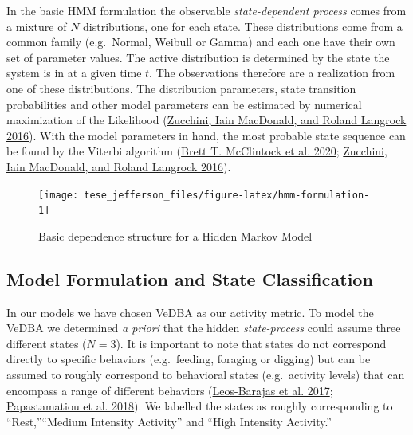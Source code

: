 \documentclass[english,msc,numbers,hidelinks]{coppe}
\begin{document}
  In the basic HMM formulation the observable \emph{state-dependent process} comes from a mixture of \(N\) distributions, one for each state. These distributions come from a common family (e.g.~Normal, Weibull or Gamma) and each one have their own set of parameter values. The active distribution is determined by the state the system is in at a given time \(t\). The observations therefore are a realization from one of these distributions. The distribution parameters, state transition probabilities and other model parameters can be estimated by numerical maximization of the Likelihood (\protect\hyperlink{ref-zucchini2016}{Zucchini, Iain MacDonald, and Roland Langrock 2016}). With the model parameters in hand, the most probable state sequence can be found by the Viterbi algorithm (\protect\hyperlink{ref-mcclintock2020}{Brett T. McClintock et al. 2020}; \protect\hyperlink{ref-zucchini2016}{Zucchini, Iain MacDonald, and Roland Langrock 2016}).
  \begin{figure}

  {\centering \texttt{[image: tese\_jefferson\_files/figure-latex/hmm-formulation-1]} 

  }

  \caption{Basic dependence structure for a Hidden Markov Model}\label{fig:hmm-formulation}
  \end{figure}
  \hypertarget{model-formulation-and-state-classification}{%
  \subsection{Model Formulation and State Classification}\label{model-formulation-and-state-classification}}

  In our models we have chosen VeDBA as our activity metric. To model the VeDBA we determined \emph{a priori} that the hidden \emph{state-process} could assume three different states (\(N=3\)). It is important to note that states do not correspond directly to specific behaviors (e.g.~feeding, foraging or digging) but can be assumed to roughly correspond to behavioral states (e.g.~activity levels) that can encompass a range of different behaviors (\protect\hyperlink{ref-leosbarajas2017}{Leos-Barajas et al. 2017}; \protect\hyperlink{ref-papastamatiou2018}{Papastamatiou et al. 2018}). We labelled the states as roughly corresponding to ``Rest,''``Medium Intensity Activity'' and ``High Intensity Activity.''
\end{document}
